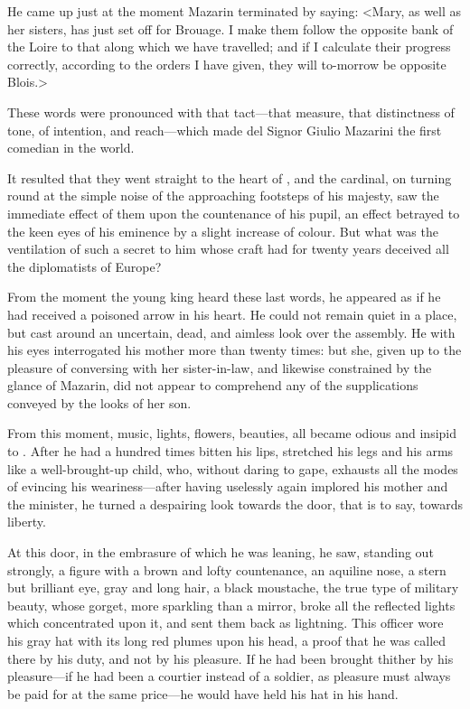 He came up just at the moment Mazarin terminated by saying: <Mary, as well as her sisters, has just set off for Brouage. I make them follow the opposite bank of the Loire to that along which we have travelled; and if I calculate their progress correctly, according to the orders I have given, they will to-morrow be opposite Blois.>

These words were pronounced with that tact—that measure, that distinctness of tone, of intention, and reach—which made del Signor Giulio Mazarini the first comedian in the world.

It resulted that they went straight to the heart of , and the cardinal, on turning round at the simple noise of the approaching footsteps of his majesty, saw the immediate effect of them upon the countenance of his pupil, an effect betrayed to the keen eyes of his eminence by a slight increase of colour. But what was the ventilation of such a secret to him whose craft had for twenty years deceived all the diplomatists of Europe?

From the moment the young king heard these last words, he appeared as if he had received a poisoned arrow in his heart. He could not remain quiet in a place, but cast around an uncertain, dead, and aimless look over the assembly. He with his eyes interrogated his mother more than twenty times: but she, given up to the pleasure of conversing with her sister-in-law, and likewise constrained by the glance of Mazarin, did not appear to comprehend any of the supplications conveyed by the looks of her son.

From this moment, music, lights, flowers, beauties, all became odious and insipid to . After he had a hundred times bitten his lips, stretched his legs and his arms like a well-brought-up child, who, without daring to gape, exhausts all the modes of evincing his weariness—after having uselessly again implored his mother and the minister, he turned a despairing look towards the door, that is to say, towards liberty.

At this door, in the embrasure of which he was leaning, he saw, standing out strongly, a figure with a brown and lofty countenance, an aquiline nose, a stern but brilliant eye, gray and long hair, a black moustache, the true type of military beauty, whose gorget, more sparkling than a mirror, broke all the reflected lights which concentrated upon it, and sent them back as lightning. This officer wore his gray hat with its long red plumes upon his head, a proof that he was called there by his duty, and not by his pleasure. If he had been brought thither by his pleasure—if he had been a courtier instead of a soldier, as pleasure must always be paid for at the same price—he would have held his hat in his hand.

